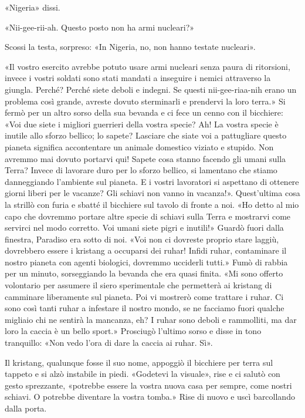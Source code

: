 «Nigeria» dissi.

«Nii-gee-rii-ah. Questo posto non ha armi nucleari?»

Scossi la testa, sorpreso: «In Nigeria, no, non hanno testate nucleari».

«Il vostro esercito avrebbe potuto usare armi nucleari senza paura di
ritorsioni, invece i vostri soldati sono stati mandati a inseguire i
nemici attraverso la giungla. Perché? Perché siete deboli e indegni. Se
questi nii-gee-riaa-nih erano un problema così grande, avreste dovuto
sterminarli e prendervi la loro terra.» Si fermò per un altro sorso
della sua bevanda e ci fece un cenno con il bicchiere: «Voi due siete i
migliori guerrieri della vostra specie? Ah! La vostra specie è inutile
allo sforzo bellico; lo sapete? Lasciare che siate voi a pattugliare
questo pianeta significa accontentare un animale domestico viziato e
stupido. Non avremmo mai dovuto portarvi qui! Sapete cosa stanno facendo
gli umani sulla Terra? Invece di lavorare duro per lo sforzo bellico, si
lamentano che stiamo danneggiando l'ambiente sul pianeta. E i vostri
lavoratori si aspettano di ottenere giorni liberi per le vacanze? Gli
schiavi non vanno in vacanza!». Quest'ultima cosa la strillò con furia e
sbatté il bicchiere sul tavolo di fronte a noi. «Ho detto al mio capo
che dovremmo portare altre specie di schiavi sulla Terra e mostrarvi
come servirci nel modo corretto. Voi umani siete pigri e inutili!»
Guardò fuori dalla finestra, Paradiso era sotto di noi. «Voi non ci
dovreste proprio stare laggiù, dovrebbero essere i kristang a occuparsi
dei ruhar! Infidi ruhar, contaminare il nostro pianeta con agenti
biologici, dovremmo ucciderli tutti.» Fumò di rabbia per un minuto,
sorseggiando la bevanda che era quasi finita. «Mi sono offerto
volontario per assumere il siero sperimentale che permetterà ai kristang
di camminare liberamente sul pianeta. Poi vi mostrerò come trattare i
ruhar. Ci sono così tanti ruhar a infestare il nostro mondo, se ne
facciamo fuori qualche migliaio chi ne sentirà la mancanza, eh? I ruhar
sono deboli e rammolliti, ma dar loro la caccia è un bello sport.»
Prosciugò l'ultimo sorso e disse in tono tranquillo: «Non vedo l'ora di
dare la caccia ai ruhar. Sì».

Il kristang, qualunque fosse il suo nome, appoggiò il bicchiere per
terra sul tappeto e si alzò instabile in piedi. «Godetevi la visuale»,
rise e ci salutò con gesto sprezzante, «potrebbe essere la vostra nuova
casa per sempre, come nostri schiavi. O potrebbe diventare la vostra
tomba.» Rise di nuovo e uscì barcollando dalla porta.

